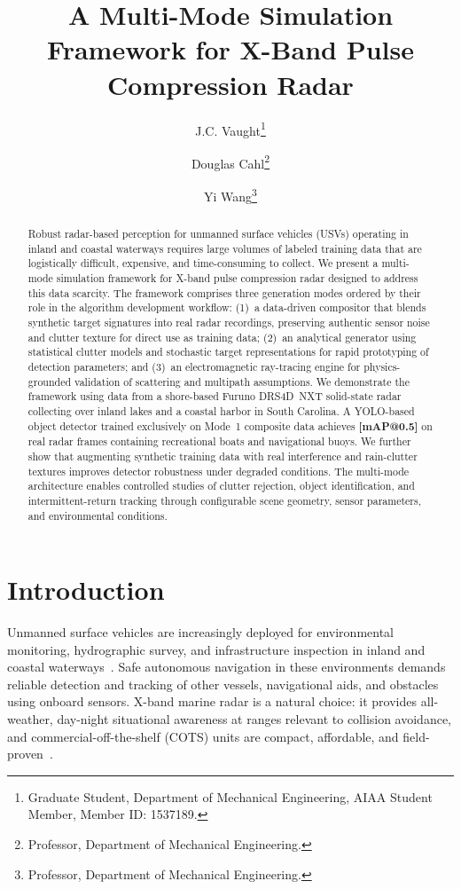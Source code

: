 \documentclass[conf]{new-aiaa}
\title{A Multi-Mode Simulation Framework for X-Band Pulse Compression Radar}
\author{J.C. Vaught\footnote{Graduate Student, Department of Mechanical Engineering, AIAA Student Member, Member ID: 1537189.}}
\author{Douglas Cahl\footnote{Professor, Department of Mechanical Engineering.}}
\author{Yi Wang\footnote{Professor, Department of Mechanical Engineering.}}
\affil{Department of Mechanical Engineering, University of South Carolina, Columbia, SC, 29208}
\newcommand{\ph}[1]{\textbf{[#1]}}
\begin{document}
\maketitle

\begin{abstract}
Robust radar-based perception for unmanned surface vehicles (USVs) operating in inland and coastal waterways requires large volumes of labeled training data that are logistically difficult, expensive, and time-consuming to collect. We present a multi-mode simulation framework for X-band pulse compression radar designed to address this data scarcity. The framework comprises three generation modes ordered by their role in the algorithm development workflow: (1)~a data-driven compositor that blends synthetic target signatures into real radar recordings, preserving authentic sensor noise and clutter texture for direct use as training data; (2)~an analytical generator using statistical clutter models and stochastic target representations for rapid prototyping of detection parameters; and (3)~an electromagnetic ray-tracing engine for physics-grounded validation of scattering and multipath assumptions. We demonstrate the framework using data from a shore-based Furuno DRS4D~NXT solid-state radar collecting over inland lakes and a coastal harbor in South Carolina. A YOLO-based object detector trained exclusively on Mode~1 composite data achieves \ph{mAP@0.5} on real radar frames containing recreational boats and navigational buoys. We further show that augmenting synthetic training data with real interference and rain-clutter textures improves detector robustness under degraded conditions. The multi-mode architecture enables controlled studies of clutter rejection, object identification, and intermittent-return tracking through configurable scene geometry, sensor parameters, and environmental conditions.
\end{abstract}

\section{Introduction}
\label{sec:intro}

Unmanned surface vehicles are increasingly deployed for environmental monitoring, hydrographic survey, and infrastructure inspection in inland and coastal waterways~\cite{han2023maritime}. Safe autonomous navigation in these environments demands reliable detection and tracking of other vessels, navigational aids, and obstacles using onboard sensors. X-band marine radar is a natural choice: it provides all-weather, day-night situational awareness at ranges relevant to collision avoidance, and commercial-off-the-shelf (COTS) units are compact, affordable, and field-proven~\cite{skolnik2001introduction}.
\end{document}
